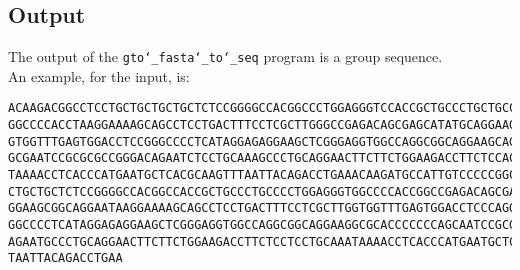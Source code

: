 \subsection*{Output}

The output of the \texttt{gto\char`_fasta\char`_to\char`_seq} program is a group sequence. \\
An example, for the input, is:
\begin{lstlisting}
ACAAGACGGCCTCCTGCTGCTGCTGCTCTCCGGGGCCACGGCCCTGGAGGGTCCACCGCTGCCCTGCTGCCATTGTCCCC
GGCCCCACCTAAGGAAAAGCAGCCTCCTGACTTTCCTCGCTTGGGCCGAGACAGCGAGCATATGCAGGAAGCGGCAGGAA
GTGGTTTGAGTGGACCTCCGGGCCCCTCATAGGAGAGGAAGCTCGGGAGGTGGCCAGGCGGCAGGAAGCAGGCCAGTGCC
GCGAATCCGCGCGCCGGGACAGAATCTCCTGCAAAGCCCTGCAGGAACTTCTTCTGGAAGACCTTCTCCACCCCCCCAGC
TAAAACCTCACCCATGAATGCTCACGCAAGTTTAATTACAGACCTGAAACAAGATGCCATTGTCCCCCGGCCTCCTGCTG
CTGCTGCTCTCCGGGGCCACGGCCACCGCTGCCCTGCCCCTGGAGGGTGGCCCCACCGGCCGAGACAGCGAGCATATGCA
GGAAGCGGCAGGAATAAGGAAAAGCAGCCTCCTGACTTTCCTCGCTTGGTGGTTTGAGTGGACCTCCCAGGCCAGTGCCG
GGCCCCTCATAGGAGAGGAAGCTCGGGAGGTGGCCAGGCGGCAGGAAGGCGCACCCCCCCAGCAATCCGCGCGCCGGGAC
AGAATGCCCTGCAGGAACTTCTTCTGGAAGACCTTCTCCTCCTGCAAATAAAACCTCACCCATGAATGCTCACGCAAGTT
TAATTACAGACCTGAA
\end{lstlisting}
